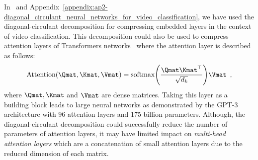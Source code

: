 In~ and Appendix~\ref{appendix:ap2-diagonal_circulant_neural_networks_for_video_classification}, we have used the diagonal-circulant decomposition for compressing embedded layers in the context of video classification.
This decomposition could also be used to compress attention layers of Transformers networks~\cite{vaswani2017attention} where the attention layer is described as follows:
\begin{equation}
  \text{Attention}(\Qmat, \Kmat, \Vmat) = \text{softmax} \left( \frac{\Qmat \Kmat^\top}{\sqrt{d_k}} \right) \Vmat \enspace,
\end{equation}
where $\Qmat, \Kmat$ and $\Vmat$ are dense matrices.
Taking this layer as a building block leads to large neural networks as demonstrated by the GPT-3 architecture with 96 attention layers and 175 billion parameters.
Although, the diagonal-circulant decomposition could successfully reduce the number of parameters of attention layers, it may have limited impact on \emph{multi-head attention layers} which are a concatenation of small attention layers due to the reduced dimension of each matrix.



%
%
%
%
%
%



